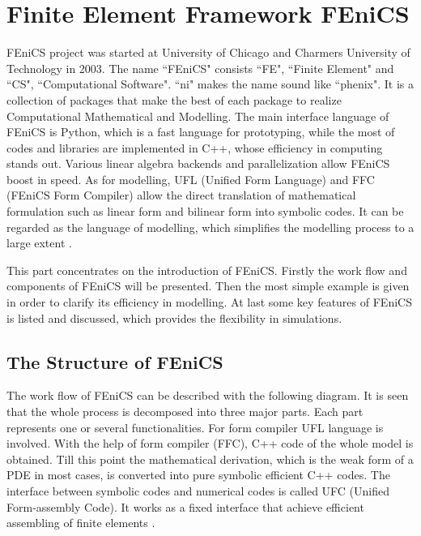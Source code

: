 %
%
%
%
%

\chapter{Finite Element Framework FEniCS}

FEniCS project was started at University of Chicago and Charmers University of Technology in 2003. The name ``FEniCS" consists ``FE", ``Finite Element" and ``CS", ``Computational Software". ``ni" makes the name sound like ``phenix". It is a collection of packages that make the best of each package to realize Computational Mathematical and Modelling. The main interface language of FEniCS is Python, which is a fast language for prototyping, while the most of codes and libraries are implemented in C++, whose efficiency in computing stands out. Various linear algebra backends and parallelization allow FEniCS boost in speed. As for modelling, UFL (Unified Form Language) and FFC (FEniCS Form Compiler) allow the direct translation of mathematical formulation such as linear form and bilinear form into symbolic codes. It can be regarded as the language of modelling, which simplifies the modelling process to a large extent \citep{kirby2006compiler}.

This part concentrates on the introduction of FEniCS. Firstly the work flow and components of FEniCS will be presented. Then the most simple example is given in order to clarify its efficiency in modelling. At last some key features of FEniCS is listed and discussed, which provides the flexibility in simulations.

\section{The Structure of FEniCS}
The work flow of FEniCS can be described with the following diagram. It is seen that the whole process is decomposed into three major parts. Each part represents one or several functionalities. For form compiler UFL language is involved. With the help of form compiler (FFC), C++ code of the whole model is obtained. Till this point the mathematical derivation, which is the weak form of a PDE in most cases, is converted into pure symbolic efficient C++ codes. The interface between symbolic codes and numerical codes is called UFC (Unified Form-assembly Code). It works as a fixed interface that achieve efficient assembling of finite elements \citep{wells2012automated}.

